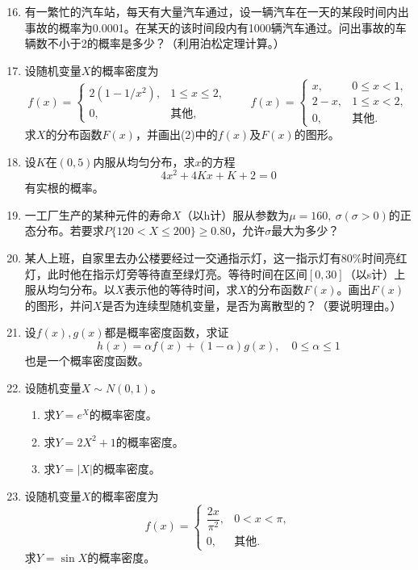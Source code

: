 \documentclass[UTF8]{ctexart}
\begin{document}
\begin{enumerate}
\setcounter{enumi}{15}
\item 有一繁忙的汽车站，每天有大量汽车通过，设一辆汽车在一天的某段时间内出事故的概率为0.0001。在某天的该时间段内有1000辆汽车通过。问出事故的车辆数不小于2的概率是多少？（利用泊松定理计算。）

\setcounter{enumi}{20}
\item 设随机变量$X$的概率密度为
\[
f(x)=
\begin{cases}
2(1-1/x^{2}), & 1\le x\le 2, \\[4pt]
0, & \text{其他},
\end{cases}
\qquad
f(x)=
\begin{cases}
x, & 0\le x<1, \\[4pt]
2-x, & 1\le x<2, \\[4pt]
0, & \text{其他}.
\end{cases}
\]
求$X$的分布函数$F(x)$，并画出(2)中的$f(x)$及$F(x)$的图形。

\setcounter{enumi}{24}
\item 设$K$在$(0,5)$内服从均匀分布，求$x$的方程
\[
4x^{2}+4Kx+K+2=0
\]
有实根的概率。

\setcounter{enumi}{28}
\item 一工厂生产的某种元件的寿命$X$（以h计）服从参数为$\mu=160,\ \sigma(\sigma>0)$的正态分布。若要求$P\{120<X\le 200\}\ge 0.80$，允许$\sigma$最大为多少？

\setcounter{enumi}{30}
\item 某人上班，自家里去办公楼要经过一交通指示灯，这一指示灯有80\%时间亮红灯，此时他在指示灯旁等待直至绿灯亮。等待时间在区间$[0,30]$（以s计）上服从均匀分布。以$X$表示他的等待时间，求$X$的分布函数$F(x)$。画出$F(x)$的图形，并问$X$是否为连续型随机变量，是否为离散型的？（要说明理由。）

\item 设$f(x),g(x)$都是概率密度函数，求证
\[
h(x)=\alpha f(x)+(1-\alpha)g(x),\quad 0\le\alpha\le 1
\]
也是一个概率密度函数。

\setcounter{enumi}{34}
\item 设随机变量$X\sim N(0,1)$。
\begin{enumerate}
\item[(1)] 求$Y=e^{X}$的概率密度。
\item[(2)] 求$Y=2X^{2}+1$的概率密度。
\item[(3)] 求$Y=|X|$的概率密度。
\end{enumerate}

\setcounter{enumi}{36}
\item 设随机变量$X$的概率密度为
\[
f(x)=
\begin{cases}
\dfrac{2x}{\pi^{2}}, & 0<x<\pi, \\[8pt]
0, & \text{其他}.
\end{cases}
\]
求$Y=\sin X$的概率密度。
\end{enumerate}
\end{document}
